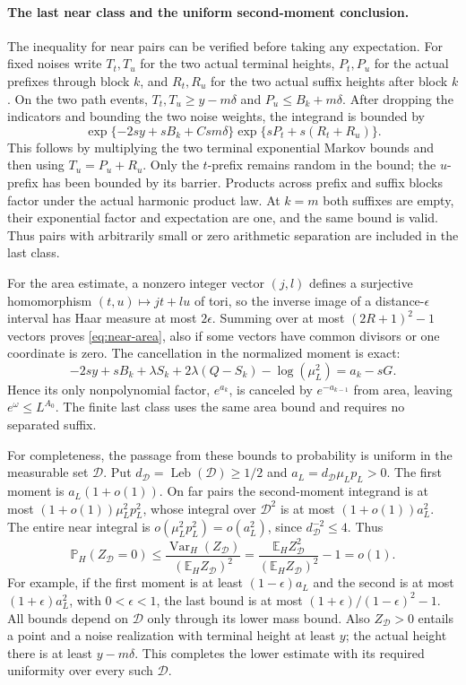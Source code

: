 \documentclass[11pt]{article}
\theoremstyle{definition}\newtheorem{definition}[theorem]{Definition}
\theoremstyle{remark}\newtheorem{remark}[theorem]{Remark}
\newcommand{\E}{\mathbb E}\newcommand{\Pp}{\mathbb P}
\newcommand{\Var}{\operatorname{Var}}\newcommand{\Poi}{\operatorname{Poi}}
\newcommand{\Leb}{\operatorname{Leb}}\newcommand{\TV}{\operatorname{TV}}
\numberwithin{equation}{section}\allowdisplaybreaks
\begin{document}
\paragraph{The last near class and the uniform second-moment conclusion.}
The inequality for near pairs can be verified before taking
any expectation. For fixed noises write $T_t,T_u$ for the
two actual terminal heights, $P_t,P_u$ for the actual prefixes
through block $k$, and $R_t,R_u$ for the two actual
suffix heights after block $k$. On the two path events,
$T_t,T_u\ge y-m\delta$ and $P_u\le B_k+m\delta$.
After dropping the indicators and bounding the two noise
weights, the integrand is bounded by
\[
 \exp\{-2sy+sB_k+Csm\delta\}
       \exp\{sP_t+s(R_t+R_u)\}.
\]
This follows by multiplying the two terminal exponential
Markov bounds and then using $T_u=P_u+R_u$.
Only the $t$-prefix remains random in the bound; the
$u$-prefix has been bounded by its barrier. Products across
prefix and suffix blocks factor under the actual harmonic
product law. At $k=m$ both suffixes are empty, their
exponential factor and expectation are one, and the same
bound is valid. Thus pairs with arbitrarily small or zero
arithmetic separation are included in the last class.

For the area estimate, a nonzero integer vector $(j,l)$
defines a surjective homomorphism
$(t,u)\mapsto jt+lu$ of tori, so the inverse image of a
distance-$\epsilon$ interval has Haar measure at most
$2\epsilon$. Summing over at most $(2R+1)^2-1$ vectors
proves \eqref{eq:near-area}, also if some vectors have
common divisors or one coordinate is zero. The cancellation
in the normalized moment is exact:
\[
 -2sy+sB_k+\lambda S_k+2\lambda(Q-S_k)
       -\log(\mu_L^2)=a_k-sG.
\]
Hence its only nonpolynomial factor, $e^{a_k}$, is canceled
by $e^{-a_{k-1}}$ from area, leaving
$e^\omega\le L^{A_0}$. The finite last class uses the same
area bound and requires no separated suffix.

For completeness, the passage from these bounds to probability
is uniform in the measurable set $\mathcal D$. Put
$d_{\mathcal D}=\Leb(\mathcal D)\ge1/2$ and
$a_L=d_{\mathcal D}\mu_Lp_L>0$. The first moment is
$a_L(1+o(1))$. On far pairs the second-moment integrand is
at most $(1+o(1))\mu_L^2p_L^2$, whose integral over
$\mathcal D^2$ is at most $(1+o(1))a_L^2$. The entire
near integral is $o(\mu_L^2p_L^2)=o(a_L^2)$, since
$d_{\mathcal D}^{-2}\le4$. Thus
\[
 \Pp_H(Z_{\mathcal D}=0)
 \le\frac{\Var_H(Z_{\mathcal D})}{(\E_H Z_{\mathcal D})^2}
 =\frac{\E_H Z_{\mathcal D}^2}{(\E_H Z_{\mathcal D})^2}-1
 =o(1).
\]
For example, if the first moment is at least
$(1-\epsilon)a_L$ and the second is at most
$(1+\epsilon)a_L^2$, with $0<\epsilon<1$, the last bound
is at most $(1+\epsilon)/(1-\epsilon)^2-1$.
All bounds depend on $\mathcal D$ only through its lower
mass bound. Also $Z_{\mathcal D}>0$ entails a point and
a noise realization with terminal height at least $y$;
the actual height there is at least $y-m\delta$.
This completes the lower estimate with its required
uniformity over every such $\mathcal D$.
\end{document}

